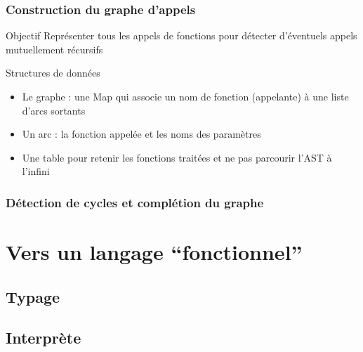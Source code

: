 \begin{frame}
  \frametitle{Construction du graphe d'appels}
  \begin{block}{Objectif}
    Représenter tous les appels de fonctions pour détecter d'éventuels appels mutuellement récursifs
  \end{block}
  \begin{block}{Structures de données}
    \begin{itemize}
      \item Le graphe : une Map qui associe un nom de fonction (appelante) à une liste d'arcs sortants
      \item Un arc : la fonction appelée et les noms des paramètres
      \item Une table pour retenir les fonctions traitées et ne pas parcourir l'AST à l'infini
    \end{itemize}
  \end{block}
\end{frame}

\begin{frame}
  \frametitle{Détection de cycles et complétion du graphe}
  \begin{block}{}
  \end{block}
\end{frame}

\section{Vers un langage ``fonctionnel''}

\subsection{Typage}

\begin{frame}
  \frametitle{}
  \begin{block}{}
  \end{block}
\end{frame}

\subsection{Interprète}

\begin{frame}
  \frametitle{}
  \begin{block}{}
  \end{block}
\end{frame}
